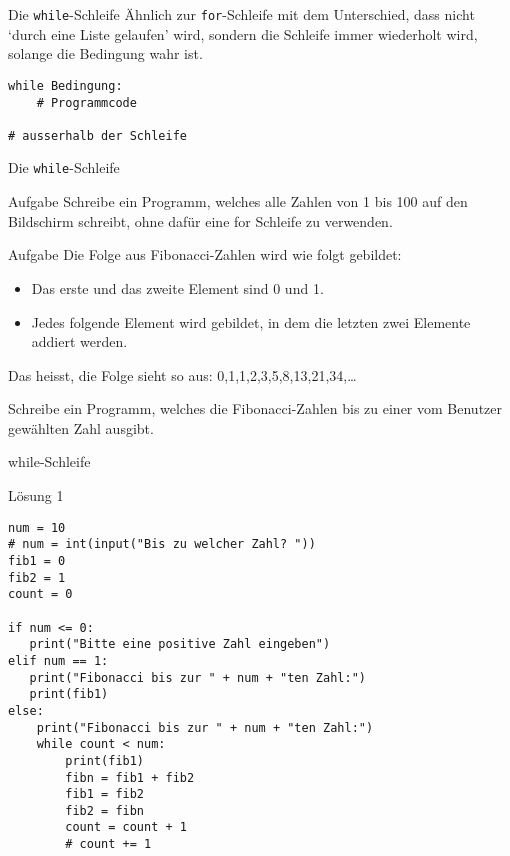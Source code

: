 \begin{frame}[fragile]{Die \texttt{while}-Schleife}
Ähnlich zur \texttt{for}-Schleife mit dem Unterschied, dass nicht `durch eine Liste gelaufen' wird, 
sondern die Schleife immer wiederholt wird, solange die Bedingung wahr ist.

    \begin{lstlisting}
while Bedingung:
    # Programmcode

# ausserhalb der Schleife
    \end{lstlisting}
\end{frame}

\begin{frame}{Die \texttt{while}-Schleife}
\begin{block}{Aufgabe}
Schreibe ein Programm, welches alle Zahlen von 1 bis 100 auf den Bildschirm schreibt, ohne dafür eine 
for Schleife zu verwenden.
\end{block}

\begin{block}{Aufgabe}
Die Folge aus Fibonacci-Zahlen wird wie folgt gebildet:
\begin{itemize}
    \item Das erste und das zweite Element sind 0 und 1.
    \item Jedes folgende Element wird gebildet, in dem die letzten zwei Elemente addiert werden.
\end{itemize}
Das heisst, die Folge sieht so aus: 0,1,1,2,3,5,8,13,21,34,\dots

Schreibe ein Programm, welches die Fibonacci-Zahlen bis zu einer vom Benutzer gewählten Zahl ausgibt.
\end{block}
\end{frame}

\begin{frame}[fragile]{while-Schleife}
\begin{exampleblock}{Lösung 1}
\begin{lstlisting}
num = 10
# num = int(input("Bis zu welcher Zahl? "))
fib1 = 0
fib2 = 1
count = 0

if num <= 0:
   print("Bitte eine positive Zahl eingeben")
elif num == 1:
   print("Fibonacci bis zur " + num + "ten Zahl:")
   print(fib1)
else:
    print("Fibonacci bis zur " + num + "ten Zahl:")
    while count < num:
	    print(fib1)
	    fibn = fib1 + fib2
	    fib1 = fib2
	    fib2 = fibn
	    count = count + 1
        # count += 1
\end{lstlisting}
\end{exampleblock}
\end{frame}

